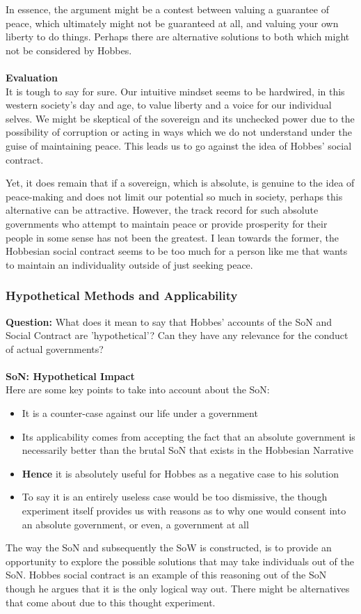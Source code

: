 \documentclass[12pt, letterpaper]{article}
\begin{document}
In essence, the argument might be a contest between valuing a guarantee of peace, which ultimately might not be guaranteed at all,  and valuing your own liberty to do things. Perhaps there are alternative solutions to both which might not be considered by Hobbes.\\\\
\textbf{Evaluation}\\
It is tough to say for sure. Our intuitive mindset seems to be hardwired, in this western society's day and age, to value liberty and a voice for our individual selves. We might be skeptical of the sovereign and its unchecked power due to the possibility of corruption or acting in ways which we do not understand under the guise of maintaining peace. This leads us to go against the idea of Hobbes' social contract.

Yet, it does remain that if a sovereign, which is absolute, is genuine to the idea of peace-making and does not limit our potential so much in society, perhaps this alternative can be attractive. However, the track record for such absolute governments who attempt to maintain peace or provide prosperity for their people in some sense has not been the greatest. I lean towards the former, the Hobbesian social contract seems to be too much for a person like me that wants to maintain an individuality outside of just seeking peace.

\subsubsection{Hypothetical Methods and Applicability}
\textbf{Question:} What does it mean to say that Hobbes' accounts of the SoN and Social Contract are 'hypothetical'? Can they have any relevance for the conduct of actual governments?\\\\
\textbf{SoN: Hypothetical Impact}\\
Here are some key points to take into account about the SoN:
\begin{itemize}
	\item It is a counter-case against our life under a government
	\item Its applicability comes from accepting the fact that an absolute government is necessarily better than the brutal SoN that exists in the Hobbesian Narrative
	\item \textbf{Hence} it is absolutely useful for Hobbes as a negative case to his solution
	\item To say it is an entirely useless case would be too dismissive, the though experiment itself provides us with reasons as to why one would consent into an absolute government, or even, a government at all
\end{itemize}
The way the SoN and subsequently the SoW is constructed, is to provide an opportunity to explore the possible solutions that may take individuals out of the SoN. Hobbes social contract is an example of this reasoning out of the SoN though he argues that it is the only logical way out. There might be alternatives that come about due to this thought experiment.
\end{document}

